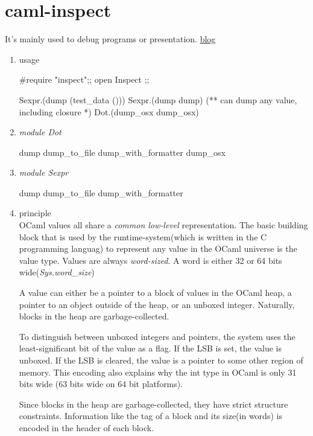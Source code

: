 \section{caml-inspect}
\label{sec:caml-inspect}
It's mainly used to debug programs or presentation.
\href{http://lambdamuesli.blogspot.com/}{blog}
\begin{enumerate}
\item usage
  \begin{bluetext}
#require "inspect";;
open Inspect ;;

Sexpr.(dump (test_data ()))
Sexpr.(dump dump) (** can dump any value, including closure *)
Dot.(dump_osx dump_osx)
\end{bluetext}



\item \textit{module Dot}
  \begin{bluetext}
    dump
    dump_to_file
    dump_with_formatter
    dump_osx
  \end{bluetext}
\item \textit{module Sexpr}
  \begin{bluetext}
    dump
    dump_to_file
    dump_with_formatter
  \end{bluetext}

\item principle \\
  OCaml values all share a \textit{common low-level} representation.
  The basic building block that is used by the runtime-system(which is
  written in the C programming languag) to represent any value in the
  OCaml universe is the value type. Values are always
  \textit{word-sized}. A word is either 32 or 64 bits
  wide(\textit{Sys.word\_size})

  A value can either be a pointer to a block of values in the OCaml
  heap, a pointer to an object outside of the heap, or an unboxed
  integer. Naturally, blocks in the heap are garbage-collected.

  To distinguish between unboxed integers and pointers, the system uses
  the least-significant bit of the value as a flag. If the LSB is set,
  the value is unboxed. If the LSB is cleared, the value is a pointer to
  some other region of memory. This encoding also explains why the int
  type in OCaml is only 31 bits wide (63 bits wide on 64 bit platforms).


  Since blocks in the heap are garbage-collected, they have strict
  structure constraints. Information like the tag of a block and its
  size(in words) is encoded in the header of each block.


\end{enumerate}
